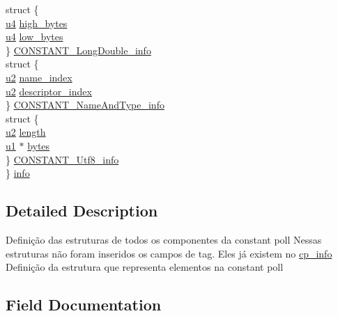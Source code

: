 \begin{DoxyCompactItemize}
\begin{tabbing}
\>struct \{\\
\>\>\hyperlink{macros_8h_ae5be1f726785414dd1b77d60df074c9d}{u4} \hyperlink{structcp__info_ac9717d5a233a28a073c738d75f2585af}{high\_bytes}\\
\>\>\hyperlink{macros_8h_ae5be1f726785414dd1b77d60df074c9d}{u4} \hyperlink{structcp__info_aa98182719e334000a87d75af9d288ff7}{low\_bytes}\\
\>\} \hyperlink{structcp__info_a07d2f775a999971955af28b38833c806}{CONSTANT\_LongDouble\_info}\\
\>struct \{\\
\>\>\hyperlink{macros_8h_a732cde1300aafb73b0ea6c2558a7a54f}{u2} \hyperlink{structcp__info_ae939ac3ca00f5727beaa02d0e339183d}{name\_index}\\
\>\>\hyperlink{macros_8h_a732cde1300aafb73b0ea6c2558a7a54f}{u2} \hyperlink{structcp__info_a3f13794b6c8b4ffc87b87a7c01a69060}{descriptor\_index}\\
\>\} \hyperlink{structcp__info_a9c65415ba2750b67adca1d6c1b01ec05}{CONSTANT\_NameAndType\_info}\\
\>struct \{\\
\>\>\hyperlink{macros_8h_a732cde1300aafb73b0ea6c2558a7a54f}{u2} \hyperlink{structcp__info_ad01efb9db3818b64eae5965bf341710f}{length}\\
\>\>\hyperlink{macros_8h_ad9f4cdb6757615aae2fad89dab3c5470}{u1} $\ast$ \hyperlink{structcp__info_ac6ab0ef16fce28e02466e662e10f4acc}{bytes}\\
\>\} \hyperlink{structcp__info_a0cfe76c8c5e8844834df4dd21391b625}{CONSTANT\_Utf8\_info}\\
\} \hyperlink{structcp__info_aa559d8cb2d9e58ab362a616f795cb2c9}{info}\\

\end{tabbing}\end{DoxyCompactItemize}


\subsection{Detailed Description}
Definição das estruturas de todos os componentes da constant poll Nessas estruturas não foram inseridos os campos de tag. Eles já existem no \hyperlink{structcp__info}{cp\+\_\+info} Definição da estrutura que representa elementos na constant poll 

\subsection{Field Documentation}
\hypertarget{structcp__info_a97a61703bfa9c32f2cfa2709825b67ee}{}
